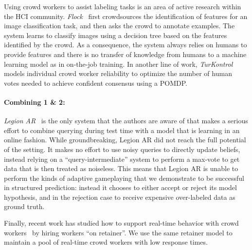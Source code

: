 Using crowd workers to assist labeling tasks is an area of active research within the HCI community.
\textit{Flock}~\cite{cheng2015flock} first crowdsources the identification of features for an image classification task, and then asks the crowd to annotate examples.
The system learns to classify images using a decision tree based on the features identified by the crowd.
As a consequence, the system always relies on humans to provide features and there is no transfer of knowledge from humans to a machine learning model as in on-the-job training.
In another line of work, \textit{TurKontrol}~\cite{dai2010decision} models individual crowd worker reliability to optimize the number of human votes needed to achieve confident consensus using a POMDP\@.

\paragraph{Combining 1 \& 2:}

\textit{Legion AR}~\cite{lasecki2013real} is the only system that the authors are aware of that makes a serious effort to combine querying during test time with a model that is learning in an online fashion. While groundbreaking, Legion AR did not reach the full potential of the setting. It makes no effort to use noisy queries to directly update beliefs, instead relying on a ``query-intermediate'' system to perform a max-vote to get data that is then treated as noiseless. This means that Legion AR is unable to perform the kinds of adaptive gameplaying that we demonstrate to be successful in structured prediction: instead it chooses to either accept or reject its model hypothesis, and in the rejection case to receive expensive over-labeled data as ground truth.



Finally, recent work has studied how to support real-time behavior with crowd workers~\cite{bernstein2011crowds,lasecki2013real} by hiring workers ``on retainer''.
We use the same retainer model to maintain a pool of real-time crowd workers with low response times.


